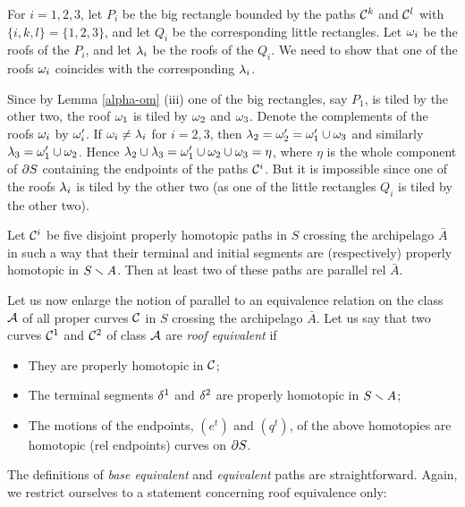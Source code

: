 \begin{pf}


 For $i=1,2,3$,  let $P_i$ be the big rectangle  bounded by the paths ${\cal C}^k$ and ${\cal C}^l$ with $\{i,k,l\}=\{1,2,3\}$,
and let $Q_i$ be the corresponding little rectangles. 
Let ${\omega}_i$ be the roofs of the $P_i$, and let ${\lambda}_i$ be the roofs of the $Q_i$. 
We need to show that one of the roofs ${\omega}_i$ coincides with the corresponding ${\lambda}_i$. 

Since by Lemma \ref{alpha-om} (iii) one of the big rectangles, say $P_1$, is tiled by the other two,
the roof ${\omega}_1$ is tiled by ${\omega}_2$ and ${\omega}_3$. 
Denote the complements of the roofs ${\omega}_i$ by ${\omega}_i'$. 
If ${\omega}_i\not={\lambda}_i$ for $i=2,3$,
then ${\lambda}_2={\omega}_2'={\omega}_1'\cup {\omega}_3$ and similarly ${\lambda}_3={\omega}_1'\cup {\omega}_2$.
Hence ${\lambda}_2\cup {\lambda}_3={\omega}_1'\cup {\omega}_2\cup {\omega}_3=\eta$, where $\eta$ is the whole component of $\partial S$
containing the endpoints of the paths ${\cal C}^i$. But it is impossible since one of the roofs ${\lambda}_i$
is tiled by the other two (as one of the little rectangles $Q_i$ is tiled by the other two).  
\end{pf}
   


\begin{cor}\label{3 paths cor}
  Let ${\cal C}^i$ be five disjoint properly homotopic  paths in $S$ crossing the archipelago $\bar A$
in such a way that their terminal and initial segments 
are (respectively) properly homotopic in $S\smallsetminus A$.
Then at least two of these paths are parallel rel $\bar A$. 
\end{cor}




Let us now enlarge the notion of parallel to an equivalence relation on the class ${\cal A}$ of all proper
curves ${\cal C}$ in $S$ crossing the archipelago $\bar A$.
Let us say that two curves ${\cal C}^1$ and ${\cal C}^2$ of class ${\cal A}$ are {\it roof equivalent}
if 
\begin{itemize} 
  \item They are properly homotopic in ${\cal C}$;
  \item The terminal segments ${\delta}^1$ and ${\delta}^2$ are properly homotopic in $S\smallsetminus A$;
  \item The motions of the endpoints,  $(e^t)$ and  $(q^t)$, of the above homotopies 
   are  homotopic  (rel endpoints) curves on $\partial S$.
\end{itemize}

The definitions of {\it base equivalent} and {\it equivalent} paths are straightforward.
Again, we restrict ourselves to a statement concerning roof equivalence only:

